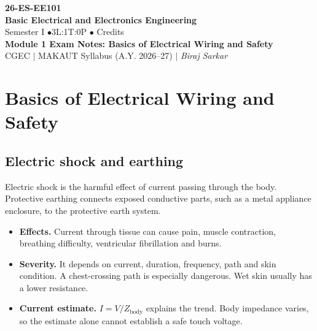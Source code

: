 \documentclass[12pt,a4paper]{article}
\begin{document}
\begin{center}
  {\Large\bfseries\color{myred} 26-ES-EE101}\\[3pt]
  {\LARGE\bfseries\color{myred} Basic Electrical and Electronics Engineering}\\[5pt]
  {\normalsize\color{mydark} Semester I \quad$\bullet$\quad 3L:1T:0P \quad$\bullet$ Credits}\\[3pt]
  {\normalsize\color{myteal}\textbf{Module 1 Exam Notes: Basics of Electrical Wiring and Safety}}\\[3pt]
  {\small\color{mydark} CGEC \;$|$\; MAKAUT Syllabus (A.Y. 2026--27) \;$|$\; \textit{Biraj Sarkar}}
\end{center}
\vspace{2pt}
\noindent{\color{myred}\rule{\linewidth}{1.5pt}}
\vspace{2pt}

\hypersetup{linkcolor=mydark}
\tableofcontents
\hypersetup{linkcolor=myteal}
\newpage

\section{Basics of Electrical Wiring and Safety}

\subsection{Electric shock and earthing}

\begin{tcolorbox}[defbox,title={Electric shock and protective earthing}]
Electric shock is the harmful effect of current passing through the body. Protective earthing connects exposed conductive parts, such as a metal appliance enclosure, to the protective earth system.
\end{tcolorbox}

\begin{itemize}[leftmargin=*, itemsep=3pt, topsep=4pt]
  \item \textbf{Effects.} Current through tissue can cause pain, muscle contraction, breathing difficulty, ventricular fibrillation and burns.
  \item \textbf{Severity.} It depends on current, duration, frequency, path and skin condition. A chest-crossing path is especially dangerous. Wet skin usually has a lower resistance.
  \item \textbf{Current estimate.} \(I=V/Z_{\mathrm{body}}\) explains the trend. Body impedance varies, so the estimate alone cannot establish a safe touch voltage.
\end{itemize}
\end{document}
